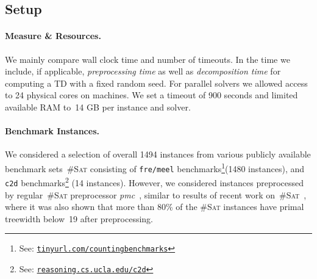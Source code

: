 \documentclass{llncs}
\newcommand{\cSAT}{\textsc{\#Sat}\xspace}%
\newcommand{\WMC}{\textsc{WMC}\xspace}%
\newcommand{\instances}[1]{\texttt{#1}}
\begin{document}
\subsection{Setup}

\paragraph{Measure \& Resources.}
We mainly compare wall clock time and number of
timeouts. 
In the time we include, if applicable, \emph{preprocessing
  time} as well as \emph{decomposition time} for computing a %
TD with a fixed random seed. %
%
%
For parallel solvers we allowed access to 24 physical cores on
machines. %
%
%
%
%
%
We set a timeout of 900 seconds and limited available RAM to~14 GB per
instance and solver.

\paragraph{Benchmark Instances.}
We considered a selection of overall 1494 instances from various
publicly available benchmark sets~\cSAT consisting of %
%
%
%
%
\instances{fre/meel} benchmarks\footnote{See:
  \href{http://tinyurl.com/countingbenchmarks}{\nolinkurl{tinyurl.com/countingbenchmarks}}}(1480
instances), %
and \instances{c2d} benchmarks\footnote{See:
  \href{http://reasoning.cs.ucla.edu/c2d/results.html}{\nolinkurl{reasoning.cs.ucla.edu/c2d}}}
(14 instances).
However, we considered instances preprocessed by regular~\cSAT preprocessor 
\emph{pmc}~\cite{LagniezMarquis14}, similar to results of recent work on~\cSAT~\cite{FichteHecherZisser19}, where it was also shown that more than 80\% of the \cSAT instances have primal treewidth below~19
after preprocessing.

%
%
%
%
\end{document}

